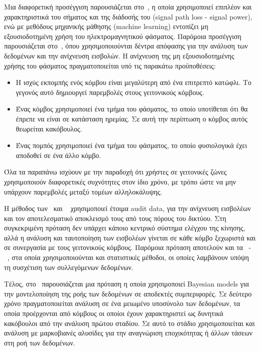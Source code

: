 \documentclass[12pt]{report}
\begin{document}
Μια διαφορετική προσέγγιση παρουσιάζεται στο~\cite{paper:06}, η οποία χρησιμοποιεί επιπλέον και χαρακτηριστικά του σήματος και της διάδοσής του (\textlatin{signal path loss - signal power}), ενώ με μεθόδους μηχανικής μάθησης (\textlatin{machine learning}) εντοπίζει μη εξουσιοδοτημένη χρήση του ηλεκτρομαγνητικού φάσματος. Παρόμοια προσέγγιση παρουσιάζεται στο~\cite{paper:13}, όπου χρησιμοποιούνται δέντρα απόφασης για την ανάλυση των δεδομένων και την ανίχνευση εισβολών. Η ανίχνευση της μη εξουσιοδοτημένης χρήσης του φάσματος πραγματοποιείται υπό τις παρακάτω προϋποθέσεις:
\begin{itemize}
  \item Η ισχύς εκπομπής ενός κόμβου είναι μεγαλύτερη από ένα επιτρεπτό κατώφλι. Το γεγονός αυτό δημιουργεί παρεμβολές στους γειτονικούς κόμβους.
  \item Ένας κόμβος χρησιμοποιεί ένα τμήμα του φάσματος, το οποίο υποτίθεται ότι θα έπρεπε να είναι σε κατάσταση ηρεμίας. Σε αυτή την περίπτωση ο κόμβος αυτός θεωρείται κακόβουλος.
  \item Ένας πομπός χρησιμοποιεί ένα τμήμα του φάσματος, το οποίο φυσιολογικά έχει αποδοθεί σε ένα άλλο κόμβο.
\end{itemize}
Όλα τα παραπάνω ισχύουν με την παραδοχή ότι χρήστες σε γειτονικές ζώνες χρησιμοποιούν διαφορετικές συχνότητες στον ίδιο χρόνο, με τρόπο ώστε να μην υπάρχουν παρεμβολές μεταξύ τομέων αλληλοκάλυψης.

Η μέθοδος των~\cite{paper:07} και ~\cite{paper:08} χρησιμοποιεί έτοιμα \textlatin{audit data}, για την ανίχνευση εισβολέων και τον αποτελεσματικό αποκλεισμό τους από τους πόρους του δικτύου. Στη συγκεκριμένη πρόταση δεν υπάρχει κάποιο κεντρικό σύστημα ελέγχου της κίνησης, αλλά η ανάλυση και ταυτοποίηση των εισβολέων γίνεται σε κάθε κόμβο ξεχωριστά και σε συνεργασία με τους γειτονικούς κόμβους. Παρόμοια πρόταση αποτελούν και τα~\cite{paper:09} -~\cite{paper:10}, στα οποία χρησιμοποιούνται και στατιστικές μέθοδοι, οι οποίες λαμβάνουν υπόψη τη συσχέτιση των συλλεγόμενων δεδομένων.

Τέλος, στο~\cite{paper:11} παρουσιάζεται μια πρόταση η οποία χρησιμοποιεί \textlatin{Bayesian models} για την μοντελοποίηση της ροής των δεδομένων σε αποδεκτές συμπεριφορές. Σε δεύτερο χρόνο πραγματοποιείται ανάλυση σε ένα μειωμένο υποσύνολο των δεδομένων, τα οποία προέρχονται από κόμβους οι οποίοι έχουν χαρακτηριστεί ως δυνητικά κακόβουλοι από την ανάλυση πρώτου σταδίου. Σε αυτό το στάδιο χρησιμοποιείται και ανάλυση με μαρκοβιανές αλυσίδες για την αναγνώριση εποχικότητας ή άλλων τάσεων στη ροή των δεδομένων.
\end{document}
